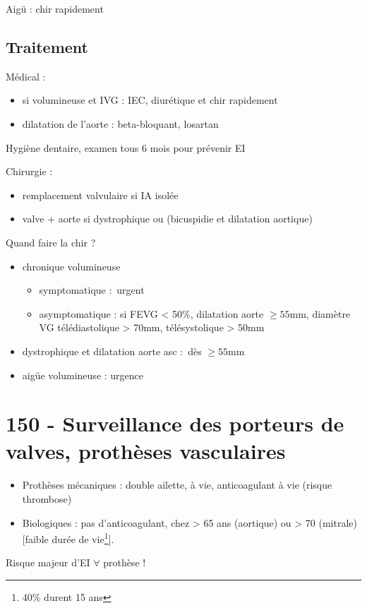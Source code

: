 Aigü : chir rapidement

\subsection{Traitement}
Médical : 
\begin{itemize}
  \item si volumineuse et IVG : IEC, diurétique et chir rapidement
  \item dilatation de l'aorte : beta-bloquant, losartan
\end{itemize}
Hygiène dentaire, examen tous 6 mois pour prévenir EI

Chirurgie : 
\begin{itemize}
  \item remplacement valvulaire si IA isolée
  \item valve + aorte si dystrophique ou (bicuspidie et dilatation aortique)
\end{itemize}

Quand faire la chir ?
\begin{itemize}
  \item chronique volumineuse
    \begin{itemize}
      \item  symptomatique : urgent \danger
      \item asymptomatique : si FEVG < 50\%, dilatation aorte $\ge 55$mm, diamètre
        VG télédiastolique > 70mm, télésystolique > 50mm
    \end{itemize}
  \item dystrophique et dilatation aorte asc : dès $\ge 55$mm
  \item aigüe volumineuse : urgence
\end{itemize}

\section{150 - Surveillance des porteurs de valves, prothèses vasculaires}%
\label{sec:150_surveillance_des_porteurs_de_valves_protheses_vasculaires}

\begin{itemize}
  \item Prothèses mécaniques : double ailette, à vie, anticoagulant à vie
    (risque thrombose)
  \item Biologiques : pas d'anticoagulant, chez > 65 ans (aortique) ou > 70
    (mitrale) [faible durée de vie\footnote{40\% durent 15 ans}].
\end{itemize}
Risque majeur d'EI $\forall$ prothèse !

